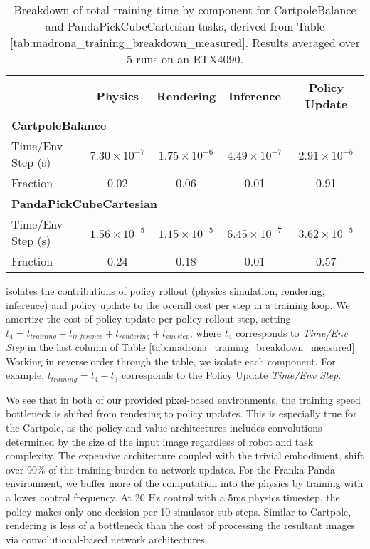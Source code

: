 \begin{table}[htbp]
    \centering
    \begin{tabular}{l c c c c}
    \toprule
             & \textbf{Physics} & \textbf{Rendering} & \textbf{Inference} & \textbf{Policy Update} \\
    \midrule
    \multicolumn{5}{l}{\textbf{CartpoleBalance}} \\ 
    Time/Env Step  (s)   & \(7.30 \times 10^{-7}\) & \(1.75 \times 10^{-6}\) & \(4.49 \times 10^{-7}\) & \(2.91 \times 10^{-5}\) \\
    Fraction & 0.02 & 0.06 & 0.01 & 0.91 \\
    \midrule
    \multicolumn{5}{l}{\textbf{PandaPickCubeCartesian}} \\ 
    Time/Env Step (s)        & \(1.56 \times 10^{-5}\) & \(1.15 \times 10^{-5}\) & \(6.45 \times 10^{-7}\) & \(3.62 \times 10^{-5}\) \\
    Fraction & 0.24 & 0.18 & 0.01 & 0.57 \\
    \bottomrule
    \end{tabular}
    \caption{Breakdown of total training time by component for CartpoleBalance and PandaPickCubeCartesian tasks, derived from Table \ref{tab:madrona_training_breakdown_measured}. Results averaged over 5 runs on an RTX4090.}
    \label{tab:madrona_training_breakdown_calc}
\end{table}




 isolates the contributions of policy rollout (physics simulation, rendering, inference) and policy update to the overall cost per step in a training loop. We amortize the cost of policy update per policy rollout step, setting $t_4 = t_{training} + t_{inference} + t_{rendering} + t_{env step}$, where $t_4$ corresponds to \emph{Time/Env Step} in the last column of Table \ref{tab:madrona_training_breakdown_measured}. Working in reverse order through the table, we isolate each component. For example, $t_{training} = t_4 - t_3$ corresponds to the Policy Update \emph{Time/Env Step}.

We see that in both of our provided pixel-based environments, the training speed bottleneck is shifted from rendering to policy updates. This is especially true for the Cartpole, as the policy and value architectures includes convolutions determined by the size of the input image regardless of robot and task complexity. The expensive architecture coupled with the trivial embodiment, shift over 90\% of the training burden to network updates. For the Franka Panda environment, we buffer more of the computation into the physics by training with a lower control frequency. At 20 Hz control with a 5ms physics timestep, the policy makes only one decision per 10 simulator sub-steps. Similar to Cartpole, rendering is less of a bottleneck than the cost of processing the resultant images via convolutional-based network architectures.

\clearpage
